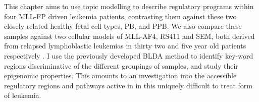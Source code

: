 
This chapter aims to use topic modelling to describe regulatory programs within four MLL-FP driven leukemia patients, contrasting them against these two closely related healthy fetal cell types, PB, and PPB. We also compare these samples against two cellular models of MLL-AF4, RS411 and SEM, both derived from relapsed lymphoblastic leukemias in thirty two and five year old patients respectively \cite{Ragusa2019}.  I use the previously developed BLDA method to identify key-word regions discriminative of the different groupings of samples, and study their epigenomic properties. This amounts to an investigation into the accessible regulatory regions and pathways active in in this uniquely difficult to treat form of leukemia. 







